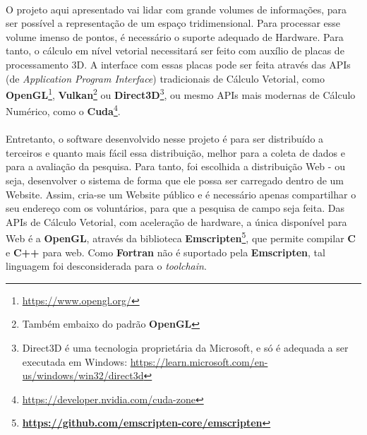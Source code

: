 \documentclass{article}
\begin{document}
	\paragraph{}
	O projeto aqui apresentado vai lidar com grande volumes de informações, para ser possível a representação de um espaço tridimensional. Para processar esse volume imenso de pontos, é necessário o suporte adequado de Hardware. Para tanto, o cálculo em nível vetorial necessitará ser feito com auxílio de placas de processamento 3D. A interface com essas placas pode ser feita através das APIs (de \textit{Application Program Interface}) tradicionais de Cálculo Vetorial, como \textbf{OpenGL}\footnote{\url{https://www.opengl.org/}}, \textbf{Vulkan}\footnote{Também embaixo do padrão \textbf{OpenGL}} ou \textbf{Direct3D}\footnote{Direct3D é uma tecnologia proprietária da Microsoft, e só é adequada a ser executada em Windows\texttrademark: \url{https://learn.microsoft.com/en-us/windows/win32/direct3d}}, ou mesmo APIs mais modernas de Cálculo Numérico, como o \textbf{Cuda}\footnote{\url{https://developer.nvidia.com/cuda-zone}}.
	
	\paragraph{}
	Entretanto, o software desenvolvido nesse projeto é para ser distribuído a terceiros e quanto mais fácil essa distribuição, melhor para a coleta de dados e para a avaliação da pesquisa. Para tanto, foi escolhida a distribuição Web - ou seja, desenvolver o sistema de forma que ele possa ser carregado dentro de um Website. Assim, cria-se um Website público e é necessário apenas compartilhar o seu endereço com os voluntários, para que a pesquisa de campo seja feita. Das APIs de Cálculo Vetorial, com aceleração de hardware, a única disponível para Web é a \textbf{OpenGL}, através da biblioteca \textbf{Emscripten}\footnote{\textbf{\url{https://github.com/emscripten-core/emscripten}}}, que permite compilar \textbf{C} e \textbf{C++} para web. Como \textbf{Fortran} não é suportado pela \textbf{Emscripten}, tal linguagem foi desconsiderada para o \textit{toolchain}.
	
\end{document}
